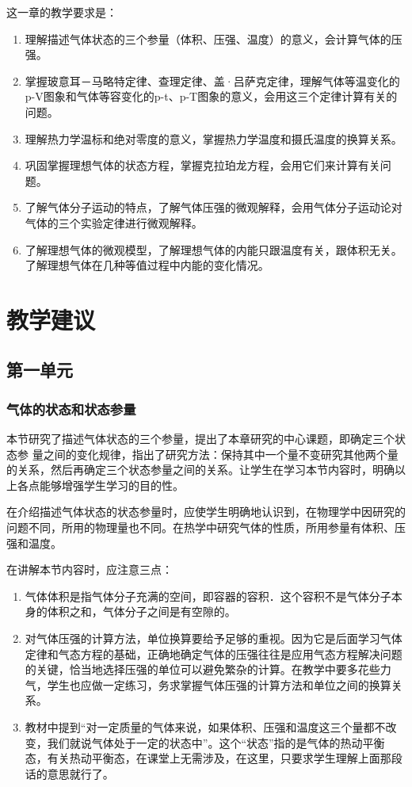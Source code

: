 这一章的教学要求是：
\begin{enumerate}
 \item 理解描述气体状态的三个参量（体积、压强、温度）的意义，会计算气体的压强。
  \item 掌握玻意耳－马略特定律、查理定律、盖·吕萨克定律，理解气体等温变化的p-V图象和气体等容变化的p-t、p-T图象的意义，会用这三个定律计算有关的问题。
  \item 理解热力学温标和绝对零度的意义，掌握热力学温度和摄氏温度的换算关系。
  \item 巩固掌握理想气体的状态方程，掌握克拉珀龙方程，会用它们来计算有关问题。
  \item 了解气体分子运动的特点，了解气体压强的微观解释，会用气体分子运动论对气体的三个实验定律进行微观解释。
  \item 了解理想气体的微观模型，了解理想气体的内能只跟温度有关，跟体积无关。了解理想气体在几种等值过程中内能的变化情况。
\end{enumerate}
 
\section{教学建议}
\subsection{第一单元}
\subsubsection{气体的状态和状态参量}

本节研究了描述气体状态的三个参量，提出了本章研究的中心课题，即确定三个状态参
量之间的变化规律，指出了研究方法：保持其中一个量不变研究其他两个量的关系，然后再确定三个状态参量之间的关系。让学生在学习本节内容时，明确以上各点能够增强学生学习的目的性。

在介绍描述气体状态的状态参量时，应使学生明确地认识到，在物理学中因研究的问题不同，所用的物理量也不同。在热学中研究气体的性质，所用参量有体积、压强和温度。

在讲解本节内容时，应注意三点：
\begin{enumerate}
\item 气体体积是指气体分子充满的空间，即容器的容积．这个容积不是气体分子本身的体积之和，气体分子之间是有空隙的。
\item 对气体压强的计算方法，单位换算要给予足够的重视。因为它是后面学习气体定律和气态方程的基础，正确地确定气体的压强往往是应用气态方程解决问题的关键，恰当地选择压强的单位可以避免繁杂的计算。在教学中要多花些力气，学生也应做一定练习，务求掌握气体压强的计算方法和单位之间的换算关系。
\item 教材中提到“对一定质量的气体来说，如果体积、压强和温度这三个量都不改变，我们就说气体处于一定的状态中”。这个“状态”指的是气体的热动平衡态，有关热动平衡态，在课堂上无需涉及，在这里，只要求学生理解上面那段话的意思就行了。
\end{enumerate}

